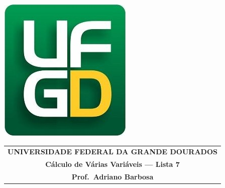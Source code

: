 \documentclass[a4paper,5pt]{amsbook}
\begin{document}
\thispagestyle{empty}
\pagestyle{empty}
\begin{minipage}[h]{0.14\textwidth}
	\includegraphics[scale=0.24]{../../ufgd.png}
\end{minipage}
\begin{minipage}[h]{\textwidth}
\begin{tabular}{c}
{{\bf UNIVERSIDADE FEDERAL DA GRANDE DOURADOS}}\\
{{\bf C\'alculo de V\'arias Vari\'aveis --- Lista 7}}\\
{{\bf Prof.\ Adriano Barbosa}}\\
\end{tabular}
\vspace{-0.45cm}
%
\end{minipage}

\end{document}
